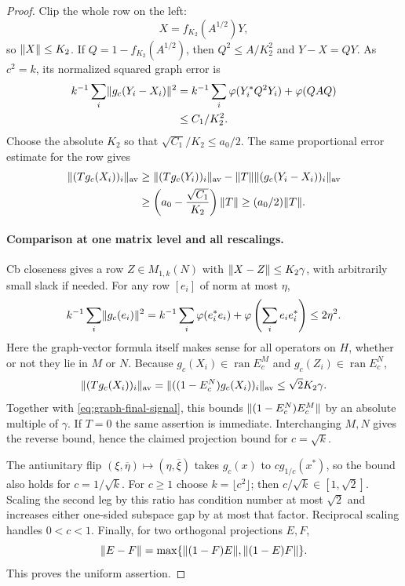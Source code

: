 \begin{proof}
Clip the whole row on the left:
\[
 X=f_{K_2}(A^{1/2})Y,
\]
so $\lVert X\rVert\leq K_2$.  If $Q=1-f_{K_2}(A^{1/2})$, then
$Q^2\leq A/K_2^2$ and $Y-X=QY$.  As $c^2=k$, its normalized squared
graph error is
\begin{align*}
 k^{-1}\sum_i\lVert g_c(Y_i-X_i)\rVert^2
 &=k^{-1}\sum_i\varphi(Y_i^*Q^2Y_i)+\varphi(QAQ)\\
 &\leq C_1/K_2^2.
\end{align*}
Choose the absolute $K_2$ so that $\sqrt{C_1}/K_2\leq a_0/2$.
The same proportional error estimate for the row gives
\begin{equation}
 \begin{aligned}
 \lVert(Tg_c(X_i))_i\rVert_{\mathrm{av}}
 &\geq\lVert(Tg_c(Y_i))_i\rVert_{\mathrm{av}}
       -\lVert T\rVert\lVert(g_c(Y_i-X_i))_i\rVert_{\mathrm{av}}\\
 &\geq\left(a_0-\frac{\sqrt{C_1}}{K_2}\right)\lVert T\rVert
 \geq(a_0/2)\lVert T\rVert.
 \end{aligned}
 \label{eq:graph-final-signal}
\end{equation}

\paragraph{Comparison at one matrix level and all rescalings.}
Cb closeness gives a row $Z\in M_{1,k}(N)$ with
$\lVert X-Z\rVert\leq K_2\gamma$, with arbitrarily small slack if needed.
For any row $[e_i]$ of norm at most $\eta$,
\[
 k^{-1}\sum_i\lVert g_c(e_i)\rVert^2
 =k^{-1}\sum_i\varphi(e_i^*e_i)+
   \varphi\left(\sum_i e_ie_i^*\right)
 \leq2\eta^2.
\]
Here the graph-vector formula itself makes sense for all operators on
$H$, whether or not they lie in $M$ or $N$.
Because $g_c(X_i)\in\operatorname{ran}E_c^M$ and
$g_c(Z_i)\in\operatorname{ran}E_c^N$,
\[
 \lVert(Tg_c(X_i))_i\rVert_{\mathrm{av}}
 =\lVert((1-E_c^N)g_c(X_i))_i\rVert_{\mathrm{av}}
 \leq\sqrt2K_2\gamma.
\]
Together with \eqref{eq:graph-final-signal}, this bounds
$\lVert(1-E_c^N)E_c^M\rVert$ by an absolute multiple of $\gamma$.
If $T=0$ the same assertion is immediate.  Interchanging $M,N$ gives
the reverse bound, hence the claimed projection bound for $c=\sqrt{k}$.

The antiunitary flip
$(\xi,\overline\eta)\mapsto(\eta,\overline\xi)$ takes
$g_c(x)$ to $c g_{1/c}(x^*)$, so the bound also holds for
$c=1/\sqrt{k}$.  For $c\geq1$ choose $k=\lfloor c^2\rfloor$;
then $c/\sqrt{k}\in[1,\sqrt2]$.  Scaling the second leg by this ratio
has condition number at most $\sqrt2$ and increases either one-sided
subspace gap by at most that factor.  Reciprocal scaling handles
$0<c<1$.  Finally, for two orthogonal projections $E,F$,
\[
 \lVert E-F\rVert=\max\{\lVert(1-F)E\rVert,\lVert(1-E)F\rVert\}.
\]
This proves the uniform assertion.
\end{proof}

